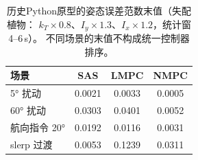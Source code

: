 \begin{table}[H]
\centering
\caption{历史Python原型的姿态误差范数末值（失配植物：
$k_T\times0.8$、$I_y\times1.3$、$I_x\times1.2$，统计窗4--6\,s）。
不同场景的末值不构成统一控制器排序。}
\label{tab:mpc_compare}
\small
\begin{tabular}{l c c c}
\toprule
\textbf{场景} & \textbf{SAS} & \textbf{LMPC} & \textbf{NMPC} \\
\midrule
5° 扰动 & 0.0021 & 0.0033 & 0.0005 \\
60° 扰动 & 0.0303 & 0.0401 & 0.0052 \\
航向指令 20° & 0.0192 & 0.0116 & 0.0031 \\
slerp 过渡 & 0.0053 & 0.1239 & 0.0311 \\
\bottomrule
\end{tabular}
\end{table}
